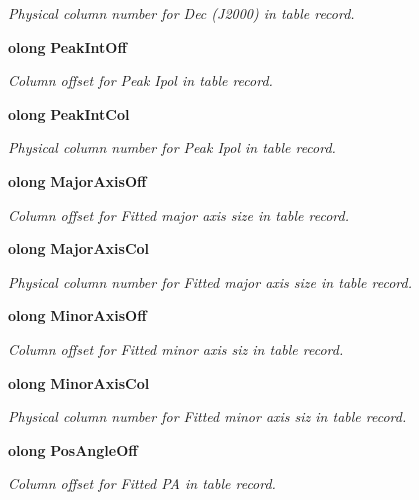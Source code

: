 \begin{CompactItemize}
\begin{CompactList}\small\item\em Physical column number for Dec (J2000) in table record. \item\end{CompactList}\item 
{\bf olong} {\bf Peak\-Int\-Off}
\begin{CompactList}\small\item\em Column offset for Peak Ipol in table record. \item\end{CompactList}\item 
{\bf olong} {\bf Peak\-Int\-Col}
\begin{CompactList}\small\item\em Physical column number for Peak Ipol in table record. \item\end{CompactList}\item 
{\bf olong} {\bf Major\-Axis\-Off}
\begin{CompactList}\small\item\em Column offset for Fitted major axis size in table record. \item\end{CompactList}\item 
{\bf olong} {\bf Major\-Axis\-Col}
\begin{CompactList}\small\item\em Physical column number for Fitted major axis size in table record. \item\end{CompactList}\item 
{\bf olong} {\bf Minor\-Axis\-Off}
\begin{CompactList}\small\item\em Column offset for Fitted minor axis siz in table record. \item\end{CompactList}\item 
{\bf olong} {\bf Minor\-Axis\-Col}
\begin{CompactList}\small\item\em Physical column number for Fitted minor axis siz in table record. \item\end{CompactList}\item 
{\bf olong} {\bf Pos\-Angle\-Off}
\begin{CompactList}\small\item\em Column offset for Fitted PA in table record. \item\end{CompactList}\item 

\end{CompactItemize}
